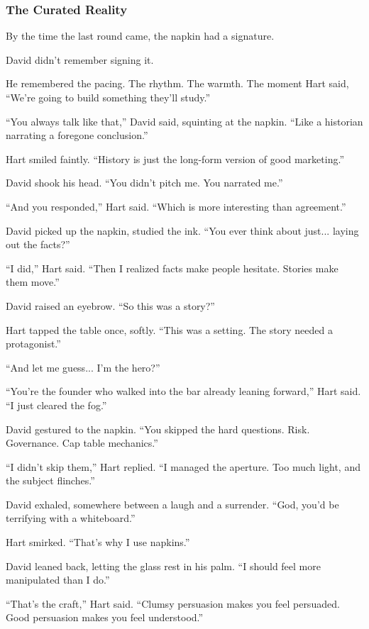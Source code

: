 \subsubsection{The Curated Reality}


By the time the last round came, the napkin had a signature.

David didn’t remember signing it.

He remembered the pacing. The rhythm. The warmth.
The moment Hart said, “We’re going to build something they’ll study.”

“You always talk like that,” David said, squinting at the napkin. “Like a historian narrating a foregone conclusion.”

Hart smiled faintly. “History is just the long-form version of good marketing.”

David shook his head. “You didn’t pitch me. You narrated me.”

“And you responded,” Hart said. “Which is more interesting than agreement.”

David picked up the napkin, studied the ink. “You ever think about just... laying out the facts?”

“I did,” Hart said. “Then I realized facts make people hesitate. Stories make them move.”

David raised an eyebrow. “So this was a story?”

Hart tapped the table once, softly. “This was a setting. The story needed a protagonist.”

“And let me guess... I’m the hero?”

“You’re the founder who walked into the bar already leaning forward,” Hart said. “I just cleared the fog.”

David gestured to the napkin. “You skipped the hard questions. Risk. Governance. Cap table mechanics.”

“I didn’t skip them,” Hart replied. “I managed the aperture. Too much light, and the subject flinches.”

David exhaled, somewhere between a laugh and a surrender. “God, you’d be terrifying with a whiteboard.”

Hart smirked. “That’s why I use napkins.”

\medskip

David leaned back, letting the glass rest in his palm. “I should feel more manipulated than I do.”

“That’s the craft,” Hart said. “Clumsy persuasion makes you feel persuaded. Good persuasion makes you feel understood.”

